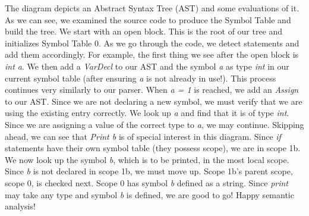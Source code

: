 \documentclass[letterpaper, 10pt]{article}
\begin{document}
The diagram depicts an Abstract Syntax Tree (AST) and some evaluations of it. As we can see, we examined the source code to produce the Symbol Table and build the tree. We start with an open block. This is the root of our tree and initializes Symbol Table 0. As we go through the code, we detect statements and add them accordingly. For example, the first thing we see after the open block is \textit{int a}. We then add a \textit{VarDecl} to our AST and the symbol \textit{a} as type \textit{int} in our current symbol table (after ensuring \textit{a} is not already in use!). This process continues very similarly to our parser. When \textit{a = 1} is reached, we add an \textit{Assign} to our AST. Since we are not declaring a new symbol, we must verify that we are using the existing entry correctly. We look up \textit{a} and find that it is of type \textit{int}. Since we are assigning a value of the correct type to \textit{a}, we may continue. Skipping ahead, we can see that \textit{Print b} is of special interest in this diagram. Since \textit{if} statements have their own symbol table (they possess scope), we are in scope 1b. We now look up the symbol \textit{b}, which is to be printed, in the most local scope. Since \textit{b} is not declared in scope 1b, we must move up. Scope 1b's parent scope, scope 0, is checked next. Scope 0 has symbol \textit{b} defined as a string. Since \textit{print} may take any type and symbol \textit{b} is defined, we are good to go! Happy semantic analysis!
\end{document}
